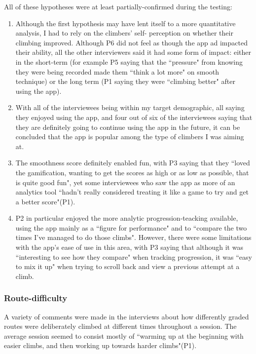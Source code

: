 All of these hypotheses were at least partially-confirmed during the testing:
\begin{enumerate}
    \item Although the first hypothesis may have lent itself to a more quantitative analysis, I had to rely on the climbers' self- perception on whether their climbing improved. Although P6 did not feel as though the app ad impacted their ability, all the other interviewers said it had some form of impact: either in the short-term (for example P5 saying that the ``pressure" from knowing they were being recorded made them ``think a lot more" on smooth technique) or the long term (P1 saying they were ``climbing better" after using the app).
    \item With all of the interviewees being within my target demographic, all saying they enjoyed using the app, and four out of six of the interviewees saying that they are definitely going to continue using the app in the future, it can be concluded that the app is popular among the type of climbers I was aiming at.
    \item The smoothness score definitely enabled fun, with P3 saying that they ``loved the gamification, wanting to get the scores as high or as low as possible, that is quite good fun", yet some interviewees who saw the app as more of an analytics tool ``hadn’t really considered treating it like a game to try and get a better score"(P1).
    \item P2 in particular enjoyed the more analytic progression-teacking available, using the app mainly as a ``figure for performance" and to ``compare the two times I've managed to do those climbs". However, there were some limitations with the app's ease of use in this area, with P3 saying that although it was ``interesting to see how they compare" when tracking progression, it was ``easy to mix it up" when trying to scroll back and view a previous attempt at a climb.
\end{enumerate}


\subsubsection{Route-difficulty}
A variety of comments were made in the interviews about how differently graded routes were deliberately climbed at different times throughout a session. 
The average session seemed to consist mostly of ``warming up at the beginning with easier climbs, and then working up towards harder climbs"(P1).

